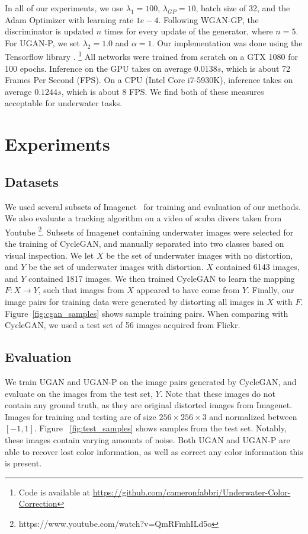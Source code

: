 \documentclass[letterpaper, 10pt, conference]{ieeeconf}
\begin{document}
In all of our experiments, we use $\lambda_{1} = 100$, $\lambda_{GP} = 10$, batch size of 32, and the Adam Optimizer
\cite{kingma2014adam} with learning rate $1e-4$. Following WGAN-GP, the discriminator is updated $n$ times for every
update of the generator, where $n = 5$. For UGAN-P, we set $\lambda_{2} = 1.0$ and $\alpha = 1$. Our implementation was done using the
Tensorflow library \cite{abadi2016tensorflow}.
\footnote{Code is available at \url{https://github.com/cameronfabbri/Underwater-Color-Correction}}
All networks were trained from scratch on a GTX 1080 for 100 epochs. Inference on the GPU takes on average $ 0.0138s$,
which is about 72 Frames Per Second (FPS). On a CPU (Intel Core i7-5930K), inference takes on average $ 0.1244s$, which
is about 8 FPS. We find both of these measures acceptable for underwater tasks.

\section{Experiments}
\subsection{Datasets}
We used several subsets of Imagenet~\cite{deng2009imagenet} for training and evaluation of our methods. We also evaluate a tracking
algorithm on a video of scuba divers taken from Youtube \footnote{https://www.youtube.com/watch?v=QmRFmhILd5o}. Subsets of Imagenet
containing underwater images were selected for the training of CycleGAN, and manually separated into two classes based on visual
inspection. We let $X$ be the set of underwater images with no distortion, and $Y$ be the set of underwater images with distortion. $X$
contained 6143 images, and $Y$ contained 1817 images. We then trained CycleGAN to learn the mapping $F: X \rightarrow Y$, such that images
from $X$ appeared to have come from $Y$. Finally, our image pairs for training data were generated by distorting all images in $X$ with
$F$. Figure~\ref{fig:cgan_samples} shows sample training pairs. When comparing with CycleGAN, we used a test set of 56 images 
acquired from
Flickr\texttrademark .

\subsection{Evaluation}
We train UGAN and UGAN-P on the image pairs generated by CycleGAN, and evaluate on the images from the
test set, $Y$. Note that these images do not contain any ground truth, as they are original distorted images from
Imagenet. Images for training and testing are of size $256 \times 256 \times 3$ and normalized between $[-1, 1]$.
Figure ~\ref{fig:test_samples} shows samples from the test set. Notably, these images contain varying amounts of noise. Both UGAN 
and UGAN-P
are able to recover lost color information, as well as correct any color information this is present. 
\end{document}
